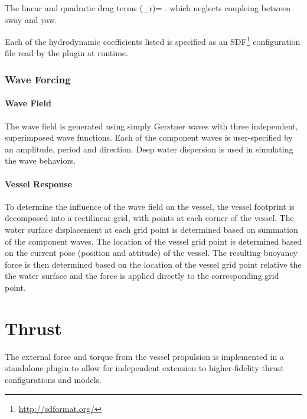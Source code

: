 \documentclass[11pt]{article}
\begin{document}
The linear and quadratic drag terms
\beqn
{}(\bm{\nu}_r)= .
\eeqn
which neglects coupleing between sway and yaw.

Each of the hydrodynamic coefficients listed is specified as an SDF\footnote{\url{http://sdformat.org/}} configuration file read by the plugin at runtime.

\subsubsection{Wave Forcing}

\paragraph{Wave Field}

The wave field is generated using simply Gerstner waves\cite{tessendorf99simulating} with three independent, superimposed wave functions.  Each of the component waves is user-specified by an amplitude, period and direction.  Deep water dispersion is used in simulating the wave behaviors.

\paragraph{Vessel Response}

To determine the influence of the wave field on the vessel, the vessel footprint is decomposed into a rectilinear grid, with points at each corner of the vessel.  The water surface displacement at each grid point is determined based on summation of the component waves.  The location of the vessel grid point is determined based on the current pose (position and attitude) of the vessel.  The resulting buoyancy force is then determined based on the location of the vessel grid point relative the the water surface and the force is applied directly to the corresponding grid point.

\section{Thrust}
The external force and torque from the vessel propulsion is implemented in a standalone plugin to allow for independent extension to higher-fidelity thrust configurations and models.
\end{document}
